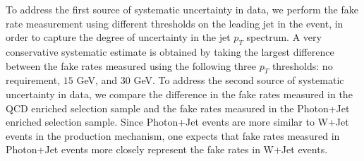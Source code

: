 To address the first source of systematic uncertainty in data, we perform the
fake rate measurement using different thresholds on the leading jet
in the event, in order to capture the degree of uncertainty in 
the jet $p_{T}$ spectrum. A very conservative systematic estimate
is obtained by taking the largest difference between the fake rates
measured using the following three $p_{T}$ thresholds: no requirement,
 $15$ GeV, and $30$ GeV. To address the second source of systematic
uncertainty in data, we compare the difference in the fake rates 
measured in the QCD enriched selection sample and the fake rates 
measured in the Photon+Jet enriched selection sample. Since Photon+Jet
events are more similar to W+Jet events in the production mechanism,
one expects that fake rates measured in Photon+Jet events more closely
represent the fake rates in W+Jet events. 

